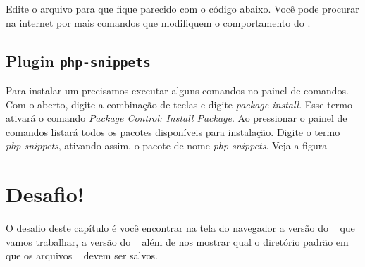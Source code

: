 Edite o arquivo para que fique parecido com o código abaixo. Você pode procurar
na internet por mais comandos que modifiquem o comportamento do \sublime.



\subsection{Plugin \texttt{php-snippets}}
\label{plugin-php-snippets}

Para instalar um \plugin precisamos executar alguns comandos no painel de comandos.
Com o \sublime aberto, digite a combinação de teclas \ctrlshiftp e digite
\textit{package install}. Esse termo ativará o comando \textit{Package Control: Install Package}.
Ao pressionar \avancar o painel de comandos listará todos os pacotes disponíveis
para instalação. Digite o termo \textit{php-snippets}, ativando assim, o pacote
de nome \textit{php-snippets}. Veja a figura


\section{Desafio!}
\label{desafio}
O desafio deste capítulo é você encontrar na tela do navegador a versão do \php~
que vamos trabalhar, a versão do \apache~ além de nos mostrar qual o diretório
padrão em que os arquivos \phpextensao~ devem ser salvos.